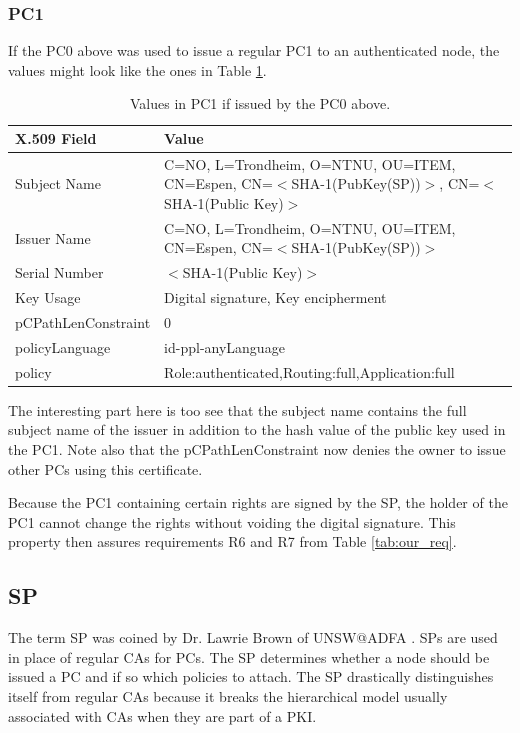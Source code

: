 \subsubsection*{\acl{PC1}}
If the PC0 above was used to issue a regular \acf{PC1} to an authenticated node,
the values might look like the ones in Table \ref{tab:pc1_values}.
\begin{table}[h]
	\begin{tabularx}{\linewidth}{ | l | X |}\hline
 		\textbf{X.509 Field} & \textbf{Value}\\\hline
		Subject Name & C=NO, L=Trondheim, O=NTNU, OU=ITEM, CN=Espen, CN=$<$SHA-1(PubKey(SP))$>$, CN=$<$SHA-1(Public Key)$>$ \\\hline
		Issuer Name & C=NO, L=Trondheim, O=NTNU, OU=ITEM, CN=Espen, CN=$<$SHA-1(PubKey(SP))$>$ \\\hline
		Serial Number & $<$SHA-1(Public Key)$>$ \\\hline 
		Key Usage & Digital signature, Key encipherment \\\hline 
		pCPathLenConstraint & 0 \\\hline 
		policyLanguage & id-ppl-anyLanguage \\\hline 
		policy & Role:authenticated,Routing:full,Application:full \\\hline 
	\end{tabularx}
	\caption{Values in \acf{PC1} if issued by the \ac{PC0} above.}
	\label{tab:pc1_values}
\end{table}
The interesting part here is too see that the subject name contains the full
subject name of the issuer in addition to the hash value of the public key used
in the PC1. Note also that the pCPathLenConstraint now denies the owner to issue
other \acp{PC} using this certificate.

Because the PC1 containing certain rights are signed by the SP, the holder of
the PC1 cannot change the rights without voiding the digital signature. This
property then assures requirements R6 and R7 from Table \ref{tab:our_req}.

\subsection{\acl{SP}}
The term \acf{SP} was coined by Dr. Lawrie Brown of UNSW@ADFA
\cite{lawrie:technotes}. \acp{SP} are used in place of regular \acp{CA} for
\acp{PC}. The \ac{SP} determines whether a node should be issued a \ac{PC} and
if so which policies to attach. The \ac{SP} drastically distinguishes itself
from regular \acp{CA} because it breaks the hierarchical model usually
associated with \acp{CA} when they are part of a \ac{PKI}.

